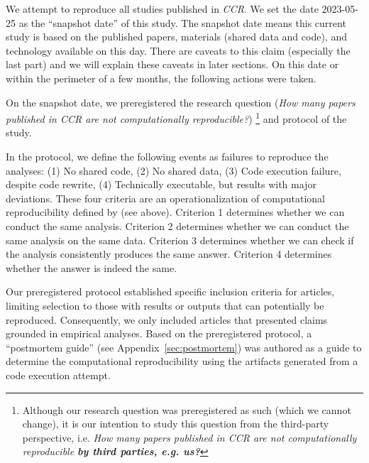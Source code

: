 We attempt to reproduce all studies published in \textit{CCR}. We set the date 2023-05-25 as the ``snapshot date'' of this study. The snapshot date means this current study is based on the published papers, materials (shared data and code), and technology available on this day. There are caveats to this claim (especially the last part) and we will explain these caveats in later sections. On this date or within the perimeter of a few months, the following actions were taken.


On the snapshot date, we preregistered the research question (\textit{How many papers published in \textit{CCR} are not computationally reproducible?}) \footnote{Although our research question was preregistered as such (which we cannot change), it is our intention to study this question from the third-party perspective, i.e. \textit{How many papers published in \textit{CCR} are not computationally reproducible \textbf{by third parties, e.g. us?}}} and protocol of the study.

In the protocol, we define the following events as failures to reproduce the analyses: (1) No shared code, (2) No shared data, (3) Code execution failure, despite code rewrite, (4) Technically executable, but results with major deviations. These four criteria are an operationalization of computational reproducibility defined by \textcite{The_Turing_Way:2022,schoch:2023:CRC,broman2017recommendations} (see above). Criterion 1 determines whether we can conduct the same analysis. Criterion 2 determines whether we can conduct the same analysis on the same data. Criterion 3 determines whether we can check if the analysis consistently produces the same answer. Criterion 4 determines whether the answer is indeed the same.

Our preregistered protocol established specific inclusion criteria for articles, limiting selection to those with results or outputs that can potentially be reproduced. 
Consequently, we only included articles that presented claims grounded in empirical analyses.
Based on the preregistered protocol, a ``postmortem guide'' (see Appendix~\ref{sec:postmortem}) was authored as a guide to determine the computational reproducibility using the artifacts generated from a code execution attempt.

